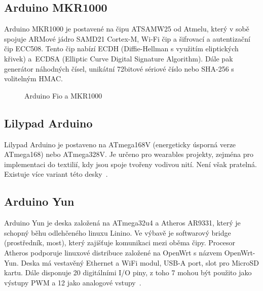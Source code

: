 	\subsection{Arduino MKR1000}
	Arduino MKR1000 je postavené na čipu ATSAMW25 od Atmelu, který v sobě spojuje ARMové jádro SAMD21 Cortex-M, Wi-Fi čip a šifrovací a autentizační čip ECC508. Tento čip nabízí ECDH (Diffie-Hellman s využitím eliptických křivek) a~ECDSA (Elliptic Curve Digital Signature Algorithm). Dále pak generátor náhodných čísel, unikátní 72bitové sériové číslo nebo SHA-256 s volitelným HMAC.
	
	
	\begin{figure}[!ht]
    \centering
			\hspace*{5mm}
		\caption{Arduino Fio a MKR1000}
		\vspace{-30pt}	
\end{figure}
	
		\subsection{Lilypad Arduino} 
		Lilypad Arduino je postaveno na ATmega168V (energeticky úsporná verze ATmega168) nebo ATmega328V. Je určeno pro wearables projekty, zejména pro implementaci do textilií, kdy jsou spoje tvořeny vodivou nití. Není však pratelná. Existuje více variant této desky~\cite{ArduinoLilipad}.	
	
	\subsection{Arduino Yun} 
	Arduino Yun je deska založená na ATmega32u4 a Atheros AR9331, který je schopný běhu odlehčeného linuxu Linino. Ve výbavě je softwarový bridge (prostředník, most), který zajišťuje komunikaci mezi oběma čipy. Procesor Atheros podporuje linuxové distribuce založené na OpenWrt s názvem OpenWrt-Yun. Deska má vestavěný Ethernet a WiFi modul, USB-A port, slot pro MicroSD kartu. Dále disponuje 20 digitálními I/O piny, z toho 7 mohou být použito jako výstupy PWM a 12 jako analogové vstupy~\cite{ArduinoYun}.	

